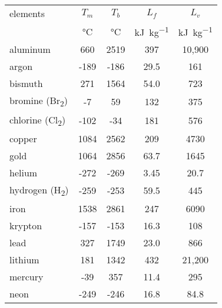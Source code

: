 \begin{center}
\begin{tabu}{ l SSSS }
    \toprule
    elements    & $T_m$
                & $T_b$
                & $L_f$
                & $L_v$ \\
                & \si{\degreeCelsius}
                & \si{\degreeCelsius}
                & \si{\kilo\joule\per\kilo\gram}
                & \si{\kilo\joule\per\kilo\gram} \\
    \midrule
    aluminum    & 660
                & 2519
                & 397
                & 10,900 \\
    argon       & -189
                & -186
                & 29.5
                & 161 \\
    bismuth     & 271
                & 1564
                & 54.0
                & 723 \\
    bromine (Br\textsubscript{2})
                & -7
                & 59
                & 132
                & 375 \\
    chlorine (Cl\textsubscript{2})
                & -102
                & -34
                & 181
                & 576 \\
    copper      & 1084
                & 2562
                & 209
                & 4730 \\
    gold        & 1064
                & 2856
                & 63.7
                & 1645 \\
    helium      & -272
                & -269
                & 3.45
                & 20.7 \\
    hydrogen (H\textsubscript{2})
                & -259
                & -253
                & 59.5
                & 445 \\
    iron        & 1538
                & 2861
                & 247
                & 6090 \\
    krypton     & -157
                & -153
                & 16.3
                & 108 \\
    lead        & 327
                & 1749
                & 23.0
                & 866 \\
    lithium     & 181
                & 1342
                & 432
                & 21,200 \\
    mercury     & -39
                & 357
                & 11.4
                & 295 \\
    neon        & -249
                & -246
                & 16.8
                & 84.8 \\

\end{tabu}
\end{center}
